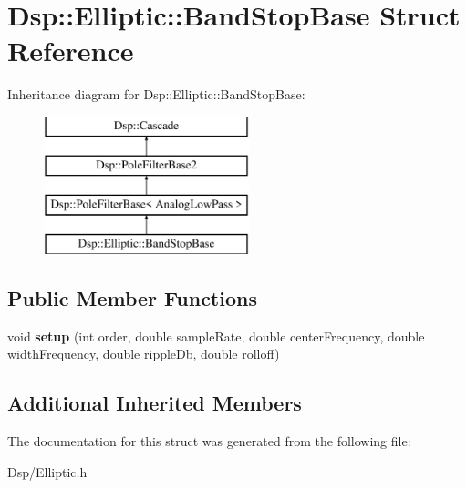 \hypertarget{structDsp_1_1Elliptic_1_1BandStopBase}{\section{Dsp\-:\-:Elliptic\-:\-:Band\-Stop\-Base Struct Reference}
\label{structDsp_1_1Elliptic_1_1BandStopBase}
}
Inheritance diagram for Dsp\-:\-:Elliptic\-:\-:Band\-Stop\-Base\-:\begin{figure}[H]
\begin{center}
\leavevmode
\includegraphics[height=4.000000cm]{structDsp_1_1Elliptic_1_1BandStopBase}
\end{center}
\end{figure}
\subsection*{Public Member Functions}
\begin{DoxyCompactItemize}
\item 
\hypertarget{structDsp_1_1Elliptic_1_1BandStopBase_abc7e4a9ea9a027b52e2105ae02bb0fba}{void {\bfseries setup} (int order, double sample\-Rate, double center\-Frequency, double width\-Frequency, double ripple\-Db, double rolloff)}\label{structDsp_1_1Elliptic_1_1BandStopBase_abc7e4a9ea9a027b52e2105ae02bb0fba}

\end{DoxyCompactItemize}
\subsection*{Additional Inherited Members}


The documentation for this struct was generated from the following file\-:\begin{DoxyCompactItemize}
\item 
Dsp/Elliptic.\-h\end{DoxyCompactItemize}
